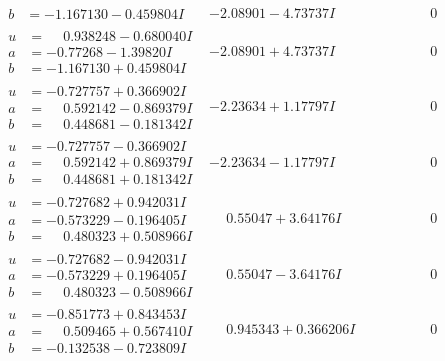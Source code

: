 \documentclass[1p]{elsarticle_modified}
\theoremstyle{definition}
\begin{document}
$$\begin{array}{c|c|c}
\begin{aligned}
b &= -1.167130 - 0.459804 I\end{aligned}
 & -2.08901 - 4.73737 I & \phantom{-0.000000 } 0 \\ \hline\begin{aligned}
u &= \phantom{-}0.938248 - 0.680040 I \\
a &= -0.77268 - 1.39820 I \\
b &= -1.167130 + 0.459804 I\end{aligned}
 & -2.08901 + 4.73737 I & \phantom{-0.000000 } 0 \\ \hline\begin{aligned}
u &= -0.727757 + 0.366902 I \\
a &= \phantom{-}0.592142 - 0.869379 I \\
b &= \phantom{-}0.448681 - 0.181342 I\end{aligned}
 & -2.23634 + 1.17797 I & \phantom{-0.000000 } 0 \\ \hline\begin{aligned}
u &= -0.727757 - 0.366902 I \\
a &= \phantom{-}0.592142 + 0.869379 I \\
b &= \phantom{-}0.448681 + 0.181342 I\end{aligned}
 & -2.23634 - 1.17797 I & \phantom{-0.000000 } 0 \\ \hline\begin{aligned}
u &= -0.727682 + 0.942031 I \\
a &= -0.573229 - 0.196405 I \\
b &= \phantom{-}0.480323 + 0.508966 I\end{aligned}
 & \phantom{-}0.55047 + 3.64176 I & \phantom{-0.000000 } 0 \\ \hline\begin{aligned}
u &= -0.727682 - 0.942031 I \\
a &= -0.573229 + 0.196405 I \\
b &= \phantom{-}0.480323 - 0.508966 I\end{aligned}
 & \phantom{-}0.55047 - 3.64176 I & \phantom{-0.000000 } 0 \\ \hline\begin{aligned}
u &= -0.851773 + 0.843453 I \\
a &= \phantom{-}0.509465 + 0.567410 I \\
b &= -0.132538 - 0.723809 I\end{aligned}
 & \phantom{-}0.945343 + 0.366206 I & \phantom{-0.000000 } 0 \\ \hline\begin{aligned}

\end{aligned}
\end{array}$$
\end{document}

